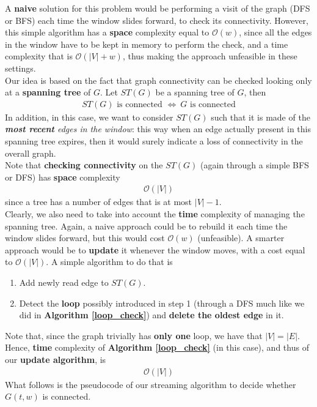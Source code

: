 A \textbf{naive} solution for this problem would be performing a visit of the graph (DFS or BFS) each time the window slides forward, to check its connectivity. However, this simple algorithm has a \textbf{space} complexity equal to $\mathcal{O}(w)$, since all the edges in the window have to be kept in memory to perform the check, and a time complexity that is $\mathcal{O}(|V| + w)$, thus making the approach unfeasible in these settings.\\
Our idea is based on the fact that graph connectivity can be checked looking only at a \textbf{spanning tree} of $G$. Let $ST(G)$ be a spanning tree of $G$, then
\begin{align*}
ST(G)\text{ is connected }\Leftrightarrow \ G\text{ is connected}
\end{align*}
In addition, in this case, we want to consider $ST(G)$ such that it is made of the \textit{\textbf{most recent} edges in the window}: this way when an edge actually present in this spanning tree expires, then it would surely indicate a loss of connectivity in the overall graph. \\
Note that \textbf{checking connectivity} on the $ST(G)$ (again through a simple BFS or DFS) has \textbf{space} complexity
\begin{align*}
\mathcal{O}(|V|)
\end{align*}
since a tree has a number of edges that is at most $|V| - 1$.\\
Clearly, we also need to take into account the \textbf{time} complexity of managing the spanning tree. Again, a naive approach could be to rebuild it each time the window slides forward, but this would cost $\mathcal{O}(w)$ (unfeasible). A smarter approach would be to \textbf{update} it whenever the window moves, with a cost equal to $\mathcal{O}(|V|)$. A simple algorithm to do that is
\begin{enumerate}
	\item Add newly read edge to $ST(G)$.
	\item Detect the \textbf{loop} possibly introduced in step 1 (through a DFS much like we did in \textbf{Algorithm \ref{loop_check}}) and \textbf{delete the oldest edge} in it.
\end{enumerate}
Note that, since the graph trivially has \textbf{only one} loop, we have that $|V| = |E|$. Hence, \textbf{time} complexity of \textbf{Algorithm \ref{loop_check}} (in this case), and thus of our \textbf{update algorithm}, is
\begin{align*}
\mathcal{O}(|V|)
\end{align*}
What follows is the pseudocode of our streaming algorithm to decide whether $G(t,w)$ is connected.

